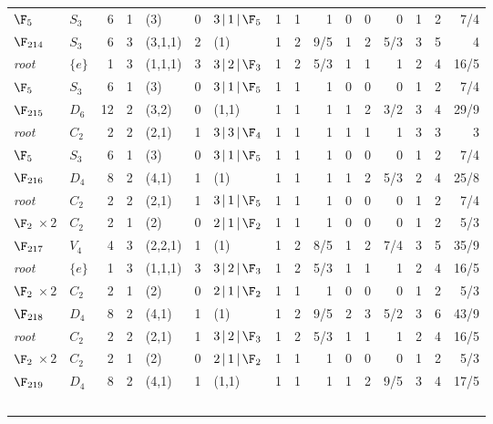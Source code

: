 \begin{landscape}
{\begin{longtable}{@{}l l r r l r l rrr rrr rrr@{}}
\quad$\F_{5}$ & $S_{3}$ & 6 & 1 & (3) & 0 & $3\,|\,1\,|\,\F_{5}$ & 1 & 1 & 1 & 0 & 0 & 0 & 1 & 2 & 7/4 \\
\addlinespace[3pt]
\textbf{$\F_{214}$} & $S_{3}$ & 6 & 3 & (3,1,1) & 2 & (1) & 1 & 2 & 9/5 & 1 & 2 & 5/3 & 3 & 5 & 4 \\
\quad\textit{root} & $\{e\}$ & 1 & 3 & (1,1,1) & 3 & $3\,|\,2\,|\,\F_{3}$ & 1 & 2 & 5/3 & 1 & 1 & 1 & 2 & 4 & 16/5 \\
\quad$\F_{5}$ & $S_{3}$ & 6 & 1 & (3) & 0 & $3\,|\,1\,|\,\F_{5}$ & 1 & 1 & 1 & 0 & 0 & 0 & 1 & 2 & 7/4 \\
\addlinespace[3pt]
\textbf{$\F_{215}$} & $D_{6}$ & 12 & 2 & (3,2) & 0 & (1,1) & 1 & 1 & 1 & 1 & 2 & 3/2 & 3 & 4 & 29/9 \\
\quad\textit{root} & $C_{2}$ & 2 & 2 & (2,1) & 1 & $3\,|\,3\,|\,\F_{4}$ & 1 & 1 & 1 & 1 & 1 & 1 & 3 & 3 & 3 \\
\quad$\F_{5}$ & $S_{3}$ & 6 & 1 & (3) & 0 & $3\,|\,1\,|\,\F_{5}$ & 1 & 1 & 1 & 0 & 0 & 0 & 1 & 2 & 7/4 \\
\addlinespace[3pt]
\textbf{$\F_{216}$} & $D_{4}$ & 8 & 2 & (4,1) & 1 & (1) & 1 & 1 & 1 & 1 & 2 & 5/3 & 2 & 4 & 25/8 \\
\quad\textit{root} & $C_{2}$ & 2 & 2 & (2,1) & 1 & $3\,|\,1\,|\,\F_{5}$ & 1 & 1 & 1 & 0 & 0 & 0 & 1 & 2 & 7/4 \\
\quad$\F_{2}$$\,{\times}2$ & $C_{2}$ & 2 & 1 & (2) & 0 & $2\,|\,1\,|\,\F_{2}$ & 1 & 1 & 1 & 0 & 0 & 0 & 1 & 2 & 5/3 \\
\addlinespace[3pt]
\textbf{$\F_{217}$} & $V_{4}$ & 4 & 3 & (2,2,1) & 1 & (1) & 1 & 2 & 8/5 & 1 & 2 & 7/4 & 3 & 5 & 35/9 \\
\quad\textit{root} & $\{e\}$ & 1 & 3 & (1,1,1) & 3 & $3\,|\,2\,|\,\F_{3}$ & 1 & 2 & 5/3 & 1 & 1 & 1 & 2 & 4 & 16/5 \\
\quad$\F_{2}$$\,{\times}2$ & $C_{2}$ & 2 & 1 & (2) & 0 & $2\,|\,1\,|\,\F_{2}$ & 1 & 1 & 1 & 0 & 0 & 0 & 1 & 2 & 5/3 \\
\addlinespace[3pt]
\textbf{$\F_{218}$} & $D_{4}$ & 8 & 2 & (4,1) & 1 & (1) & 1 & 2 & 9/5 & 2 & 3 & 5/2 & 3 & 6 & 43/9 \\
\quad\textit{root} & $C_{2}$ & 2 & 2 & (2,1) & 1 & $3\,|\,2\,|\,\F_{3}$ & 1 & 2 & 5/3 & 1 & 1 & 1 & 2 & 4 & 16/5 \\
\quad$\F_{2}$$\,{\times}2$ & $C_{2}$ & 2 & 1 & (2) & 0 & $2\,|\,1\,|\,\F_{2}$ & 1 & 1 & 1 & 0 & 0 & 0 & 1 & 2 & 5/3 \\
\addlinespace[3pt]
\textbf{$\F_{219}$} & $D_{4}$ & 8 & 2 & (4,1) & 1 & (1,1) & 1 & 1 & 1 & 1 & 2 & 9/5 & 3 & 4 & 17/5 \\
$$
\end{longtable}}
\end{landscape}

